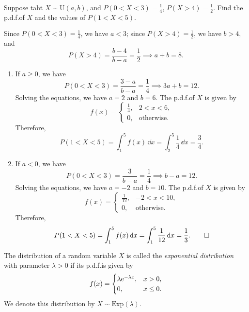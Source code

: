 \begin{example}
  Suppose taht \(X \sim \mathrm{U}(a, b)\), and \(P(0 < X < 3) = \frac{1}{4}\), \(P(X > 4) = \frac{1}{2}\). Find the p.d.f.\@ of \(X\) and the values of \(P(1 < X < 5)\).
\end{example}

\begin{solution}
  Since \(P(0 < X < 3) = \frac{1}{4}\), we have \(a < 3\); since \(P(X > 4) = \frac{1}{2}\), we have \(b > 4\), and
  \[
    P(X > 4) = \frac{b - 4}{b - a} = \frac{1}{2} \implies a + b = 8.
  \]
  \begin{enumerate}
    \item If \(a \geq 0\), we have
    \[
      P(0 < X < 3) = \frac{3 - a}{b - a} = \frac{1}{4} \implies 3a + b = 12.
    \]
    Solving the equations, we have \(a = 2\) and \(b = 6\). The p.d.f.\@ of \(X\) is given by
    \[
      f(x) = \begin{cases}
        \frac{1}{4}, & 2 < x < 6, \\
        0, & \text{otherwise}.
      \end{cases}
    \]
    Therefore,
    \[
      P(1 < X < 5) = \int_1^5 f(x)\,\dd x = \int_2^5 \frac{1}{4}\,\dd x = \frac{3}{4}.
    \]
    \item If \(a < 0\), we have
    \[
      P(0 < X < 3) = \frac{3}{b - a} = \frac{1}{4} \implies b - a = 12.
    \]
    Solving the equations, we have \(a = -2\) and \(b = 10\). The p.d.f.\@ of \(X\) is given by
    \[
      f(x) = \begin{cases}
        \frac{1}{12}, & -2 < x < 10, \\
        0, & \text{otherwise}.
      \end{cases}
    \]
    Therefore,
    \[
      P(1 < X < 5) = \int_1^5 f(x)\,\mathrm{d} x = \int_1^5 \frac{1}{12}\,\mathrm{d} x = \frac{1}{3}. \qedhere
    \]
  \end{enumerate}
\end{solution}

\begin{definition}
  The distribution of a random variable \(X\) is called the \emph{exponential distribution} with parameter \(\lambda > 0\) if its p.d.f.\@ is given by
  \[
    f(x) = \begin{cases}
      \lambda \mathrm{e}^{-\lambda x}, & x > 0, \\
      0, & x \leq 0.
    \end{cases}
  \]
  We denote this distribution by \(X \sim \mathrm{Exp}(\lambda)\).
\end{definition}

